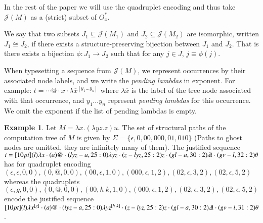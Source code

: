 \documentclass{elsarticle}
\theoremstyle{plain}
\theoremstyle{definition}
\newtheorem{example}{Example}[section]
\theoremstyle{remark}
\newcommand{\ghostlmd}{{\lambda\!\!\lambda}}
\newcommand{\ghostvar}{\theta}
\def\justseqset{\mathcal{J}}
\begin{document}
In the rest of the paper we will use the quadruplet encoding and thus take
$\justseqset(M)$ as a (strict) subset of $O_4^*$.


We say that two subsets $J_1\subseteq \justseqset(M_1)$ and $J_2\subseteq\justseqset(M_2)$ are isomorphic, written $J_1\cong J_2$, if  there exists a structure-preserving bijection between $J_1$ and $J_2$. That is there exists a bijection $\phi :J_1\longrightarrow J_2$ such that for any $j\in J$, $j\equiv\phi(j)$.


 When typesetting a sequence from $\justseqset(M)$, we represent occurrences by their associated node labels, and we write the \emph{pending lambdas} in exponent. For example:
$t = \cdots @ \cdot x \cdot \lambda\overline{x}^{[y_1 \ldots y_n]}$
where $\lambda\overline{x}$ is the label of the tree node associated with that occurrence, and $y_1 \ldots y_n$ represent \emph{pending lambdas} for this occurrence. We omit the exponent if the list of pending lambdas is empty.

\begin{example}
\label{examp:ghost_materialization}
    Let $M = \lambda x. (\lambda y z.z) u$. The set of structural paths of the computation tree of $M$ is given by $\Sigma = \{\epsilon, 0, 00,000, 01,010\}$ (Paths to ghost nodes are omitted, they are infinitely many of them).
    The justified sequence
    $t = \Pstr[10pt]{
        (l){\lambda x} \cdot (a)@ \cdot (lyz-a,25:0){\lambda y z} \cdot (z-lyz,25:2)z \cdot (gl-a,30:2)\ghostlmd \cdot (gv-l,32:2)\ghostvar }
    $
    has for quadruplet encoding
    $(\epsilon, \epsilon ,0,0), (0,@,0,0), (00, \epsilon, 1,0), (000,\epsilon, 1,2), (02,\epsilon,3,2), (02,\epsilon,5,2) $ whereas the quadruplets $ (\epsilon, g ,0,0), (0,@,0,0), (00, h~k, 1,0), (000,\epsilon, 1,2), (02,\epsilon,3,2), (02,\epsilon,5,2) $ encode the justified sequence
    $\Pstr[10pt]{
        (l){\lambda x^{[g]}} \cdot (a)@ \cdot (lyz-a,25:0){\lambda y z^{[h~k]}} \cdot (z-lyz,25:2)z \cdot (gl-a,30:2)\ghostlmd \cdot (gv-l,31:2)\ghostvar }
    $.
\end{example}
\end{document}
